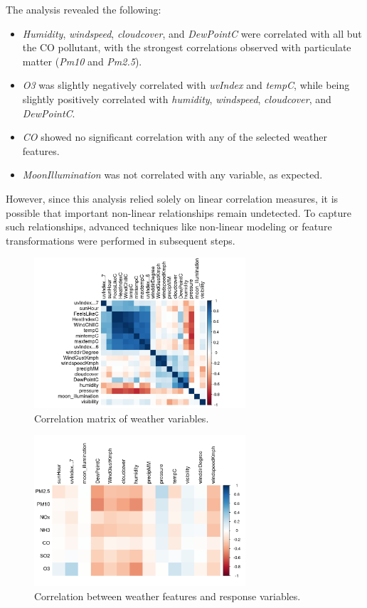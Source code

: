 \documentclass[twoside,11pt]{article}
\begin{document}
The analysis revealed the following:
\begin{itemize}
    \item \textit{Humidity}, \textit{windspeed}, \textit{cloudcover}, and \textit{DewPointC} were correlated with all but the CO pollutant, with the strongest correlations observed with particulate matter (\textit{Pm10} and \textit{Pm2.5}).
    \item \textit{O3} was slightly negatively correlated with \textit{uvIndex} and \textit{tempC}, while being slightly positively correlated with \textit{humidity}, \textit{windspeed}, \textit{cloudcover}, and \textit{DewPointC}.
    \item \textit{CO} showed no significant correlation with any of the selected weather features.
    \item \textit{MoonIllumination} was not correlated with any variable, as expected.
\end{itemize}

However, since this analysis relied solely on linear correlation measures, it is possible that important non-linear relationships remain undetected. To capture such relationships, advanced techniques like non-linear modeling or feature transformations were performed in subsequent steps.

\begin{figure}[H]
  \centering
  \includegraphics[width=0.7\textwidth]{correlation-matrix.png}
  \caption{Correlation matrix of weather variables.}
  \label{fig:correlation_matrix}
\end{figure}

\begin{figure}[H]
    \centering
    \includegraphics[width=0.7\textwidth]{feature-response-correlation.png}
    \caption{Correlation between weather features and response variables.}
    \label{fig:feature_response_correlation}
\end{figure}
\end{document}
